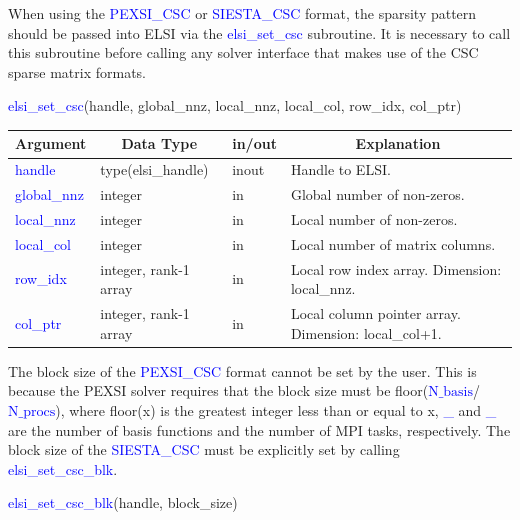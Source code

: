 \documentclass{report}
\begin{document}
When using the \textcolor{blue}{PEXSI\_CSC} or \textcolor{blue}{SIESTA\_CSC} format, the sparsity pattern should be passed into ELSI via the \textcolor{blue}{elsi\_set\_csc} subroutine.  It is necessary to call this subroutine before calling any solver interface that makes use of the CSC sparse matrix formats.
\begin{labeling}{\hspace{6cm}}
\item [\hspace{0.3cm} \textcolor{blue}{elsi\_set\_csc}(handle, global\_nnz, local\_nnz, local\_col, row\_idx, col\_ptr)]
\end{labeling}

\begin{tabular}[]{|p{30mm}|p{35mm}|p{15mm}|p{85mm}|}
\hline
\multicolumn{1}{|c|}{\textbf{Argument}} & \multicolumn{1}{c|}{\textbf{Data Type}} & \multicolumn{1}{c|}{\textbf{in/out}} & \multicolumn{1}{c|}{\textbf{Explanation}}\\
\hline
\textcolor{blue}{handle}      & type(elsi\_handle)    & inout & Handle to ELSI.\\
\hline
\textcolor{blue}{global\_nnz} & integer               & in    & Global number of non-zeros.\\
\hline
\textcolor{blue}{local\_nnz}  & integer               & in    & Local number of non-zeros.\\
\hline
\textcolor{blue}{local\_col}  & integer               & in    & Local number of matrix columns.\\
\hline
\textcolor{blue}{row\_idx}    & integer, rank-1 array & in    & Local row index array.  Dimension: local\_nnz.\\
\hline
\textcolor{blue}{col\_ptr}    & integer, rank-1 array & in    & Local column pointer array.  Dimension: local\_col+1.\\
\hline
\end{tabular}

The block size of the \textcolor{blue}{PEXSI\_CSC} format cannot be set by the user.  This is because the PEXSI solver requires that the block size must be floor(\textcolor{blue}{$\text{N}\_\text{basis}$}/\textcolor{blue}{$\text{N}\_\text{procs}$}), where floor(x) is the greatest integer less than or equal to x, \textcolor{blue}{\_} and \textcolor{blue}{\_} are the number of basis functions and the number of MPI tasks, respectively.  The block size of the \textcolor{blue}{SIESTA\_CSC} must be explicitly set by calling \textcolor{blue}{elsi\_set\_csc\_blk}.
\begin{labeling}{\hspace{6cm}}
\item [\hspace{0.3cm} \textcolor{blue}{elsi\_set\_csc\_blk}(handle, block\_size)]
\end{labeling}
\end{document}
